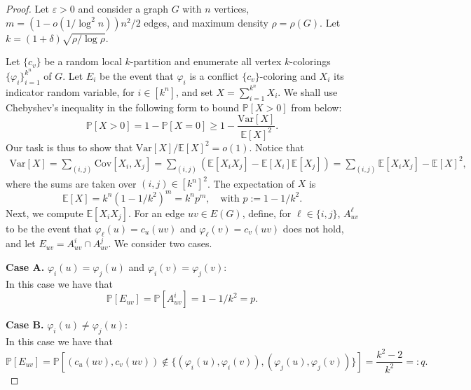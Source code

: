 \documentclass[12pt]{article}
\newcommand{\E}{\mathbb{E}}
\renewcommand{\P}{\mathbb{P}}
\newcommand{\Var}{\text{Var}}
\newcommand{\1}{\mathds{1}}
\begin{document}
\begin{proof}
    Let $\varepsilon>0$ and consider a graph $G$ with $n$ vertices, $m= (1-o(1/\log^2n))n^2/2$ edges, and maximum density $\rho =\rho(G)$. Let $k=(1+\delta)\sqrt{\rho/\log \rho}$.


	Let $\{c_v\}$ be a random local $k$-partition and enumerate all vertex $k$-colorings 
	$\{\varphi_i\}_{i=1}^{k^n}$ of $G$. Let $E_i$ be the event that $\varphi_i$ is a conflict $\{c_v\}$-coloring and $X_i$ its indicator random variable, for $i\in [k^n]$, and set $X=\sum_{i=1}^{k^n}X_i$. 
We shall use Chebyshev's inequality in the following form to bound $\P[X>0]$ from below:
    $$
    \P[X>0]=1-\P[X=0]\geq 1-\frac{\Var[X]}{\E[X]^2}.
    $$
    Our task is thus to show that $\Var[X]/\E[X]^2 =o(1)$.    
	Notice that
    \begin{align*}
        \Var[X]=\sum_{(i,j)}\text{Cov}[X_i, X_j] 
        = \sum_{(i,j)} \left( \E[X_iX_j]-\E[X_i]\E[X_j]\right)
        =\sum_{(i,j)} \E[X_iX_j]-\E[X]^2,
    \end{align*}
    where the sums are taken over $(i,j)\in [k^n]^2$.
    The expectation of $X$ is
    $$
    \E[X]
    =k^n(1-1/k^2)^m=k^np^m, \quad \text{with }p:=1-1/k^2.
    $$
    Next, we compute $\E[X_iX_j]$. For an edge $uv\in E(G)$, 
    define, for $\ell \in \{i,j\}$, $A^\ell_{uv}$ to be the event that $\varphi_\ell(u)=c_{u}(uv)$ and $\varphi_\ell(v)=c_{v}(uv)$ does not hold, and let $E_{uv}=A^i_{uv}\cap A^j_{uv}$. We consider two cases.
    

    \vspace{\baselineskip}

    \textbf{Case A.} $\varphi_i(u)=\varphi_j(u)$ and $\varphi_i(v)=\varphi_j(v)$: \hfill \\ 
   In this case we have that
 $$
    \P[E_{uv}]=\P[A^i_{uv}]=1-1/k^2=p.
    $$
    
    \vspace{\baselineskip}

    \textbf{Case B.} 
	$\varphi_i(u)\neq \varphi_j(u)$: \hfill\\
In this case we have that 
    $$
    \P[E_{uv}]=\P[(c_u(uv),c_v(uv))\notin \{(\varphi_i(u),\varphi_i(v)), (\varphi_j(u), \varphi_j(v))\}] =\frac{k^2-2}{k^2}=:q.
    $$

    \vspace{\baselineskip}


\end{proof}
\end{document}
